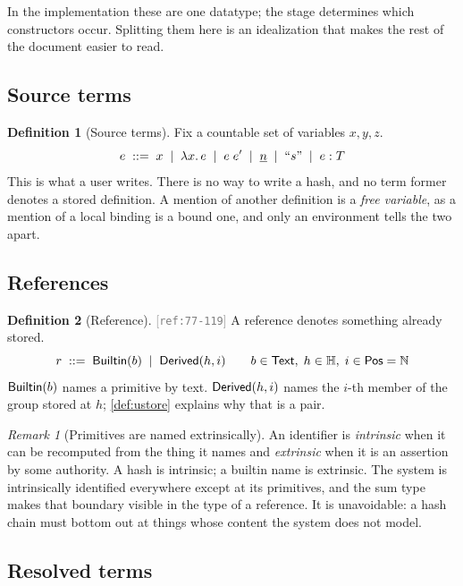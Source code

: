 \documentclass[11pt]{article}
\theoremstyle{definition}
\newtheorem{definition}{Definition}[section]
\theoremstyle{plain}
\theoremstyle{remark}
\newtheorem{remark}{Remark}[section]
\newcommand{\src}[1]{{\footnotesize\textcolor{gray}{[\texttt{#1}]}}}
\begin{document}
In the implementation these are one datatype; the stage determines which constructors occur.
Splitting them here is an idealization that makes the rest of the document easier to read.

\subsection{Source terms}

\begin{definition}[Source terms]\label{def:uterm}
Fix a countable set of variables $x,y,z$.
\[
  e \;::=\; x \;\mid\; \lambda x.\,e \;\mid\; e\;e'
        \;\mid\; \underline{n} \;\mid\; \text{``}s\text{''} \;\mid\; e : T
\]
This is what a user writes. There is no way to write a hash, and no term former denotes a stored
definition. A mention of another definition is a \emph{free variable}, as a mention of a local
binding is a bound one, and only an environment tells the two apart.
\end{definition}

\subsection{References}

\begin{definition}[Reference]\label{def:uref}
\src{ref:77-119} A reference denotes something already stored.
\[
  r \;::=\; \mathsf{Builtin}(b) \;\mid\; \mathsf{Derived}(h,i)
  \qquad b \in \mathsf{Text},\; h \in \mathbb{H},\; i \in \mathsf{Pos} = \mathbb{N}
\]
$\mathsf{Builtin}(b)$ names a primitive by text. $\mathsf{Derived}(h,i)$ names the $i$-th member of the group stored
at $h$; \cref{def:ustore} explains why that is a pair.
\end{definition}

\begin{remark}[Primitives are named extrinsically]\label{rem:builtin}
An identifier is \emph{intrinsic} when it can be recomputed from the thing it names and
\emph{extrinsic} when it is an assertion by some authority. A hash is intrinsic; a builtin name is
extrinsic. The system is intrinsically identified everywhere except at its primitives, and the sum
type makes that boundary visible in the type of a reference. It is unavoidable: a hash chain must
bottom out at things whose content the system does not model.
\end{remark}

\subsection{Resolved terms}
\end{document}
